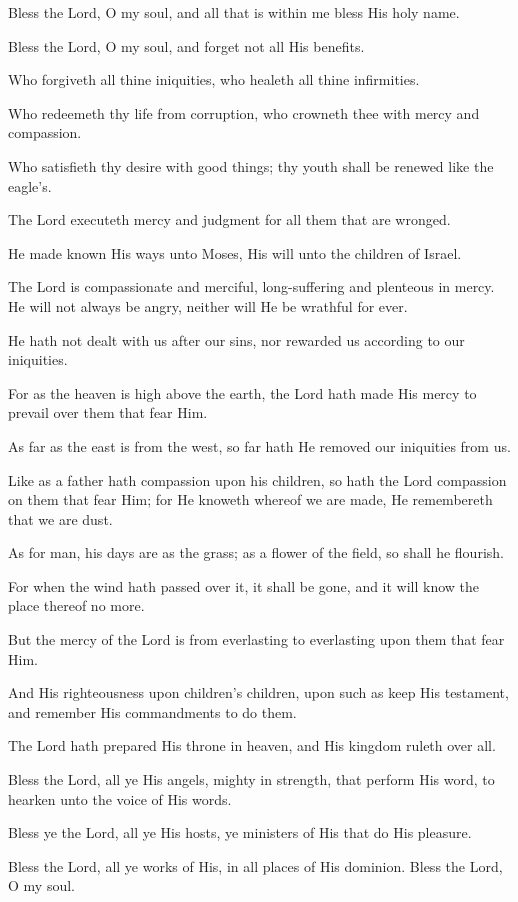 Bless the Lord, O my soul, and all that is within me bless His holy name.

Bless the Lord, O my soul, and forget not all His benefits.

Who forgiveth all thine iniquities, who healeth all thine infirmities.

Who redeemeth thy life from corruption, who crowneth thee with mercy and compassion.

Who satisfieth thy desire with good things; thy youth shall be renewed like the eagle's.

The Lord executeth mercy and judgment for all them that are wronged.

He made known His ways unto Moses, His will unto the children of Israel.

The Lord is compassionate and merciful, long-suffering and plenteous in mercy. He will not always be angry, neither will He be wrathful for ever.

He hath not dealt with us after our sins, nor rewarded us according to our iniquities.

For as the heaven is high above the earth, the Lord hath made His mercy to prevail over them that fear Him.

As far as the east is from the west, so far hath He removed our iniquities from us.

Like as a father hath compassion upon his children, so hath the Lord compassion on them that fear Him; for He knoweth whereof we are made, He remembereth that we are dust.

As for man, his days are as the grass; as a flower of the field, so shall he flourish.

For when the wind hath passed over it, it shall be gone, and it will know the place thereof no more.

But the mercy of the Lord is from everlasting to everlasting upon them that fear Him.

And His righteousness upon children's children, upon such as keep His testament, and remember His commandments to do them.

The Lord hath prepared His throne in heaven, and His kingdom ruleth over all.

Bless the Lord, all ye His angels, mighty in strength, that perform His word, to hearken unto the voice of His words.

Bless ye the Lord, all ye His hosts, ye ministers of His that do His pleasure.

Bless the Lord, all ye works of His, in all places of His dominion. Bless the Lord, O my soul.
